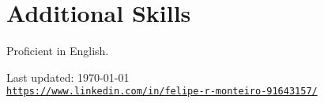 \documentclass[letterpaper]{article}
\def\footerlink{https://www.linkedin.com/in/felipe-r-monteiro-91643157/}
\renewenvironment{itemize}{
  \begin{list}{}{
    \setlength{\leftmargin}{1.5em}
  }
}{
  \end{list}
}
\begin{document}
\section*{Additional Skills}
\begin{itemize}
  \item Proficient in English.
\end{itemize}

\bigskip

\begin{center}
  \begin{footnotesize}
    Last updated: \today \\
    \href{\footerlink}{\texttt{\footerlink}}
  \end{footnotesize}
\end{center}
\end{document}
